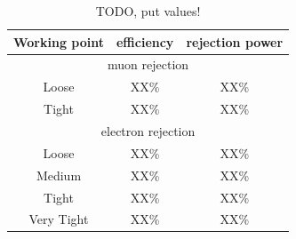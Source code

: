 \begin{table}
\begin{center}
\caption{TODO, put values!}
\begin{tabular}{|c|c|c|}
 \toprule
 Working point & efficiency & rejection power \\
 \midrule
 \multicolumn{3}{|c|}{muon rejection} \\
 \hline
 Loose & XX\% & XX\% \\
 Tight   & XX\% & XX\% \\
 \hline
 \multicolumn{3}{|c|}{electron rejection} \\
 \hline
 Loose    & XX\% & XX\% \\
 Medium & XX\% & XX\% \\
 Tight     & XX\% & XX\% \\
 Very Tight & XX\% & XX\% \\
 \bottomrule
\end{tabular}
\end{center}
\label{tab:tau_lep_rej}
\end{table}
